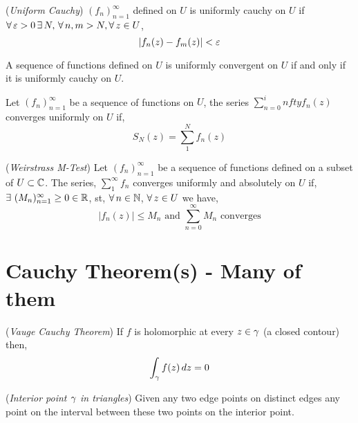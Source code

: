 \documentclass{article}
\begin{document}
\begin{ndefi}{(\textit{Uniform Cauchy})}
  $(f_n)_{n=1}^\infty$ defined on $U$ is uniformly cauchy on $U$ if $\forall\,\varepsilon>0\,\exists\, N,\,\forall\, n, m > N, \forall\, z\in U$,
  $$ |f_n(z) - f_m(z)| < \varepsilon $$
\end{ndefi}

\begin{nlemma}
  A sequence of functions defined on $U$ is uniformly convergent on $U$ if and only if it is uniformly cauchy on $U$.
\end{nlemma}

\begin{nlemma}
  Let $(f_n)_{n=1}^\infty$ be a sequence of functions on $U$, the series $\displaystyle{\sum_{n=0}^infty {f_n(z)}}$ converges uniformly on $U$ if,
  $$ S_N(z) = \sum_{1}^N f_n(z) $$
\end{nlemma}

\begin{nthm}{(\textit{Weirstrass M-Test})}
  Let $(f_n)_{n=1}^\infty$ be a sequence of functions defined on a subset of $U\subset\mathbb{C}$. The series, $\displaystyle{\sum_1^\infty {f_n}}$ converges uniformly and absolutely on $U$ if, $\exists\,\, (M_n)_{n=1}^\infty \ge 0 \in \mathbb{R}$, st, $\forall\, n \in \mathbb{N}$, $\forall\, z\in U$ we have,
  $$ |f_n(z)| \le M_n \text{ and } \sum_{n=0}^\infty {M_n} \text{ converges}$$
\end{nthm}

\section{Cauchy Theorem(s) - Many of them}
\begin{nthm}{(\textit{Vauge Cauchy Theorem})}
  If $f$ is holomorphic at every $z\in\gamma$ (a closed contour) then,
  $$ \int_\gamma f(z)\,dz = 0$$
\end{nthm}

\begin{ndefi}{(\textit{Interior point $\gamma$ in triangles})}
  Given any two edge points on distinct edges any point on the interval between these two points on the interior point.
\end{ndefi}

\begin{figure}[!ht]
  \centering
\end{figure}
\end{document}
